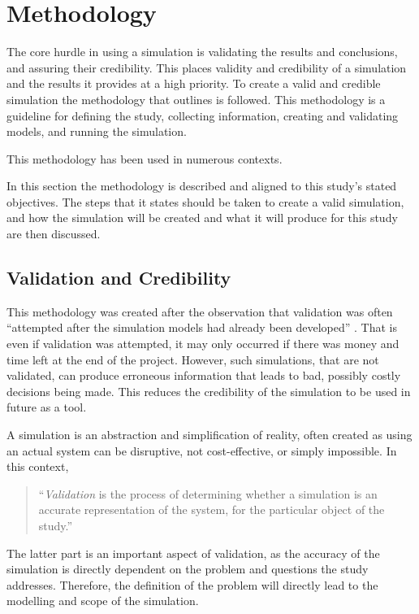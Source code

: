 \section{Methodology}
{}The core hurdle in using a simulation is validating the results and conclusions, and assuring their credibility.
{}This places validity and credibility of a simulation and the results it provides at a high priority.
{}To create a valid and credible simulation the methodology that \cite{Law2005} outlines is followed.
{}This methodology is a guideline for defining the study, collecting information, creating and validating models, and running the simulation.

This methodology has been used in numerous contexts. %

{}In this section the methodology is described and aligned to this study's stated objectives. 
{}The steps that it states should be taken to create a valid simulation, and how the simulation will be created and what it will produce for this study are then discussed.

\subsection{Validation and Credibility}
This methodology was created after the observation that validation was often ``attempted after the simulation models had already been developed'' \cite{Law2005}.
That is even if validation was attempted, it may only occurred if there was money and time left at the end of the project.
However, such simulations, that are not validated, can produce erroneous information that leads to bad, possibly costly decisions being made.
This reduces the credibility of the simulation to be used in future as a tool.

A simulation is an abstraction and simplification of reality, often created as using an actual system can be disruptive, not cost-effective, or simply impossible.
In this context,

\begin{quotation}
``\textit{Validation} is the process of determining whether a simulation is an accurate representation of the system, for the particular object of the study.'' \cite{Law2005}
\end{quotation}

The latter part is an important aspect of validation, as the accuracy of the simulation is directly dependent on the problem and questions the study addresses.
Therefore, the definition of the problem will directly lead to the modelling and scope of the simulation.

